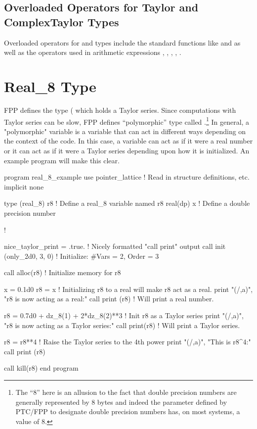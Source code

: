 \documentclass{hitec}     %
\newcommand{\Section}[1]{\section{#1}\vspace*{-1ex}}
\begin{document}
\subsection{Overloaded Operators for Taylor and ComplexTaylor Types}
\label{s:taylor.over}

Overloaded operators for  and  types include the standard functions
like  and  as well as the operators used in arithmetic expressions \vn{+}, \vn{-},
\vn{*}, \vn{/}, \vn{**}.

\Section{Real_8 Type}
\label{s:real.8}

FPP defines the  type ( which holds a Taylor series. Since computations
with Taylor series can be slow, FPP defines ``polymorphic'' type called .\footnote
  {
The ``8'' here is an allusion to the fact that double precision numbers are generally represented
by 8 bytes and indeed the  parameter defined by PTC/FPP to designate double precision numbers
has, on most systems, a value of 8.
  }
In general, a "polymorphic" variable is a variable that can act in different ways depending on the
context of the code. In this case, a  variable can act as if it were a real number or it
can act as if it were a Taylor series depending upon how it is initialized. 
An example program will make this clear.
\begin{code}
program real_8_example
use pointer_lattice   ! Read in structure definitions, etc.
implicit none

type (real_8) r8      ! Define a real_8 variable named r8
real(dp) x            ! Define a double precision number

!

nice_taylor_print = .true.    ! Nicely formatted "call print" output
call init (only_2d0, 3, 0)    ! Initialize: #Vars = 2, Order = 3

call alloc(r8)          ! Initialize memory for r8

x = 0.1d0
r8 = x                  ! Initializing r8 to a real will make r8 act as a real.
print "(/,a)", "r8 is now acting as a real:"
call print (r8)         ! Will print a real number.

r8 = 0.7d0 + dz_8(1) + 2*dz_8(2)**3   ! Init r8 as a Taylor series
print "(/,a)", "r8 is now acting as a Taylor series:"
call print(r8)                        ! Will print a Taylor series.

r8 = r8**4  ! Raise the Taylor series to the 4th power
print "(/,a)", "This is r8^4:"
call print (r8)

call kill(r8)
end program
\end{code}
\end{document}

